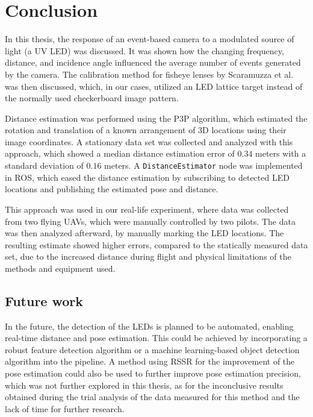 
\chapter{Conclusion\label{chap:conclusion}}
In this thesis, the response of an event-based camera to a modulated source of light (a \ac{UV} \ac{LED}) was discussed.
It was shown how the changing frequency, distance, and incidence angle influenced the average number of events generated by the camera.
The calibration method for fisheye lenses by Scaramuzza et al.~\cite{scaramuzzacalibration} was then discussed, which, in our cases,
utilized an LED lattice target instead of the normally used checkerboard image pattern.

Distance estimation was performed using the \ac{P3P} algorithm, which estimated the rotation and translation of a known
arrangement of 3D locations using their image coordinates. A stationary data set was collected and analyzed with this
approach, which showed a median distance estimation error of $0.34$ meters with a standard deviation of $0.16$ meters.
A \texttt{DistanceEstimator} node was implemented in \ac{ROS}, which eased the distance estimation by subscribing
to detected \ac{LED} locations and publishing the estimated pose and distance.

This approach was used in our real-life experiment, where data was collected from two flying \ac{UAV}s, which were manually controlled by two pilots.
The data was then analyzed afterward, by manually marking the \ac{LED} locations. The resulting estimate showed
higher errors, compared to the statically measured data set, due to the increased distance during flight and physical
limitations of the methods and equipment used.

\section{Future work}
In the future, the detection of the \ac{LED}s is planned to be automated, enabling real-time distance and pose estimation.
This could be achieved by incorporating a robust feature detection algorithm or a machine learning-based object detection
algorithm into the pipeline.
A method using \ac{RSSR} for the improvement of the pose estimation could also be used to further improve pose estimation precision,
which was not further explored in this thesis, as for the inconclusive results obtained during the trial analysis of the data measured for this method and the lack of time for further research.